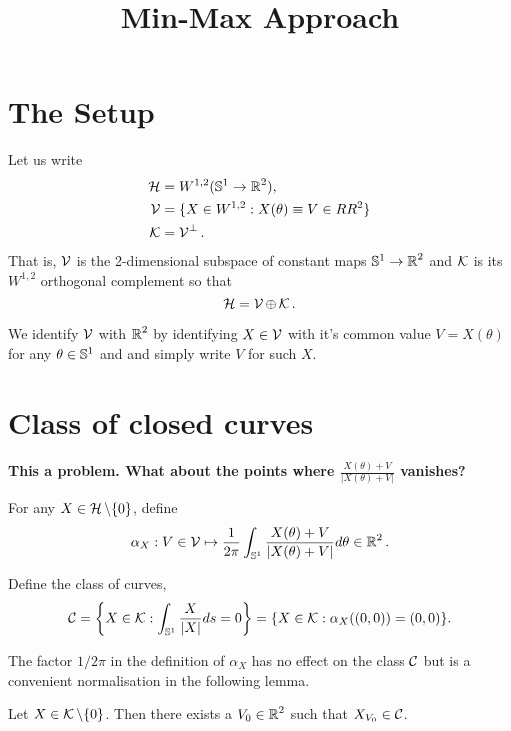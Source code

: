 \documentclass[12pt]{article}
\title{Min-Max Approach}
\date{}
\begin{document}
\maketitle

\section{The Setup}

Let us write
\begin{align*}
\operatorname{\mathcal{H}} &= W^{1,2}(\operatorname{\mathbb{S}^1} \to \operatorname{\mathbb{R}}^2), \\
\operatorname{\mathcal{V}} &= \{X \in W^{1,2} : X(\theta) \equiv V \in RR^2\} \\
\operatorname{\mathcal{K}} &= \operatorname{\mathcal{V}}^{\perp}.
\end{align*}
That is, $\operatorname{\mathcal{V}}$ is the 2-dimensional subspace of constant maps \(\operatorname{\mathbb{S}^1} \to \operatorname{\mathbb{R}}^2\) and $\operatorname{\mathcal{K}}$ is its $W^{1,2}$ orthogonal complement so that
\[
\operatorname{\mathcal{H}} = \operatorname{\mathcal{V}} \oplus \operatorname{\mathcal{K}}.
\]

We identify $\operatorname{\mathcal{V}}$ with $\operatorname{\mathbb{R}}^2$ by identifying $X \in \operatorname{\mathcal{V}}$ with it's common value $V = X(\theta)$ for any $\theta \in \operatorname{\mathbb{S}^1}$ and and simply write $V$ for such $X$.

\section{Class of closed curves}
\label{sec-1}

\textbf{This a problem. What about the points where \(\frac{X(\theta) + V}{|X(\theta) + V|}\) vanishes?}

For any \(X \in \operatorname{\mathcal{H}} \operatorname{\backslash} \{0\}\), define
\[
\alpha_X : V \in \operatorname{\mathcal{V}} \mapsto \frac{1}{2\pi} \int_{\operatorname{\mathbb{S}^1}} \frac{X(\theta) + V}{|X(\theta) + V|} d\theta \in \operatorname{\mathbb{R}}^2.
\]

Define the class of curves,
\[
\operatorname{\mathcal{C}} = \left\lbrace X \in \operatorname{\mathcal{K}} : \int_{\operatorname{\mathbb{S}^1}} \frac{X}{|X|} ds = 0 \right\rbrace = \lbrace X \in \operatorname{\mathcal{K}} : \alpha_X((0, 0)) = (0, 0) \rbrace.
\]

The factor \(1/2\pi\) in the definition of \(\alpha_X\) has no effect on the class \(\operatorname{\mathcal{C}}\) but is a convenient normalisation in the following lemma.

\begin{lemma}
\label{lem:translate_C}
Let \(X \in \operatorname{\mathcal{K}} \backslash \lbrace 0 \rbrace\). Then there exists a \(V_0 \in \operatorname{\mathbb{R}}^2\) such that \(X_{V_0} \in \operatorname{\mathcal{C}}\).
\end{lemma}
\end{document}
